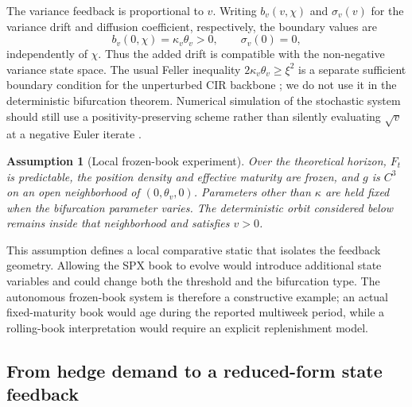 \documentclass[11pt]{article}
\newtheorem{assumption}{Assumption}
\begin{document}
The variance feedback is proportional to $v$.  Writing $b_v(v,\chi)$ and $\sigma_v(v)$
for the variance drift and diffusion coefficient, respectively, the boundary values are
\[
b_v(0,\chi)=\kappa_v\theta_v>0,
\qquad \sigma_v(0)=0,
\]
independently of $\chi$.  Thus the added drift is compatible with the non-negative
variance state space.  The usual Feller inequality $2\kappa_v\theta_v\geq\xi^2$ is a
separate sufficient boundary condition for the unperturbed CIR backbone
\citep{feller1951}; we do not use it in the deterministic bifurcation theorem.  Numerical
simulation of the stochastic system should still use a positivity-preserving scheme rather
than silently evaluating $\sqrt v$ at a negative Euler iterate
\citep{lordkoekkoekvandijk2010}.

\begin{assumption}[Local frozen-book experiment]
\label{ass:local}
Over the theoretical horizon, $F_t$ is predictable, the position density and effective
maturity are frozen, and $g$ is $C^3$ on an open neighborhood of
$(0,\theta_v,0)$.  Parameters other than $\kappa$ are held fixed when the bifurcation
parameter varies.  The deterministic orbit considered below remains inside that
neighborhood and satisfies $v>0$.
\end{assumption}

This assumption defines a local comparative static that isolates the feedback geometry.
Allowing the SPX book to evolve would introduce additional state variables and could change
both the threshold and the bifurcation type.  The autonomous frozen-book system is therefore
a constructive example; an actual fixed-maturity book would age during the reported multiweek
period, while a rolling-book interpretation would require an explicit replenishment model.

\subsection{From hedge demand to a reduced-form state feedback}
\end{document}
